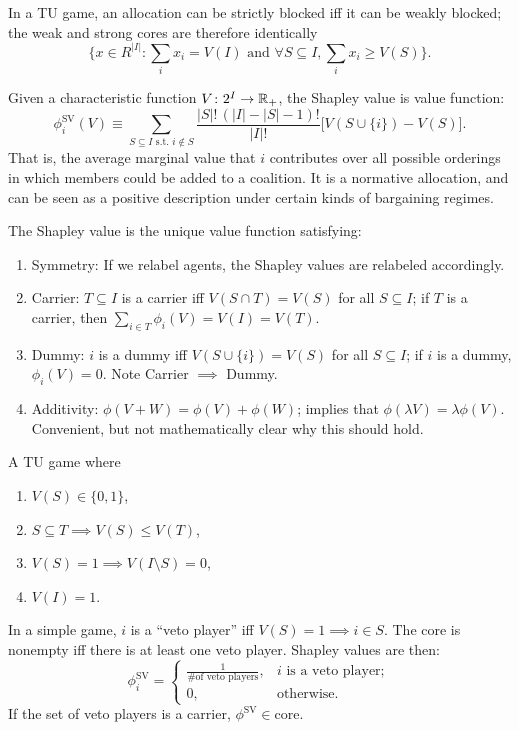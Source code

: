 \documentclass[8pt,letterpaper, landscape]{extarticle} %
\begin{document}
\begin{multicols}{3}
\begin{description}
In a TU game, an allocation can be strictly blocked iff it can be weakly blocked; the weak and strong cores are therefore identically
$$ \{ x \in R^{\lvert I \rvert} \colon \sum_{i} x_i = V(I) \text{ and } \forall S \subseteq I, \sum_{i} x_i \geq V(S) \} . $$

 Given a characteristic function $ V \colon 2^I \to \mathbb{R}_+ $, the Shapley value is value function:
\[ \phi_i^{\text{SV}} (V) \equiv \sum_{S \subseteq I \text{ s.t.~} i \not \in S} \frac{\lvert S \rvert ! \, (\lvert I \rvert - \lvert S \rvert - 1)!}{\lvert I \rvert!} \bigl[ V(S \cup \{ i \}) - V(S) \bigr] . \]
That is, the average marginal value that $ i $ contributes over all possible orderings in which members could be added to a coalition. It is a normative allocation, and can be seen as a positive description under certain kinds of bargaining regimes.

The Shapley value is the unique value function satisfying:
\begin{enumerate}
\item Symmetry: If we relabel agents, the Shapley values are relabeled accordingly.
\item Carrier: $ T \subseteq I $ is a carrier iff $ V (S \cap T) = V(S) $ for all $ S \subseteq I $; if $ T $ is a carrier, then $ \sum_{i \in T} \phi_i (V) = V(I) = V(T) $.
\item Dummy: $ i $ is a dummy iff $ V(S \cup \{ i \}) = V(S) $ for all $ S \subseteq I $; if $ i $ is a dummy, $ \phi_i (V) = 0 $. Note Carrier $ \implies $ Dummy.
\item Additivity: $ \phi (V + W) = \phi(V) + \phi(W) $; implies that $ \phi (\lambda V) = \lambda \phi (V) $. Convenient, but not mathematically clear why this should hold.
\end{enumerate}

 A TU game where
\begin{enumerate}
\item $ V(S) \in \{ 0,1 \} $,
\item $ S \subseteq T \implies V(S) \leq V(T) $,
\item $ V(S) = 1 \implies V(I \setminus S) = 0 $,
\item $ V(I) = 1 $.
\end{enumerate}

In a simple game, $ i $ is a ``veto player'' iff $ V(S) = 1 \implies i \in S $. The core is nonempty iff there is at least one veto player. Shapley values are then:
\[ \phi_i^{\text{SV}} = \begin{cases}
\tfrac{1}{\text{\# of veto players}}, & i \text{ is a veto player}; \\
0, & \text{otherwise}.
\end{cases} \]
If the set of veto players is a carrier, $ \phi^{\text{SV}} \in \text{core} $.


\end{description}
\end{multicols}
\end{document}
